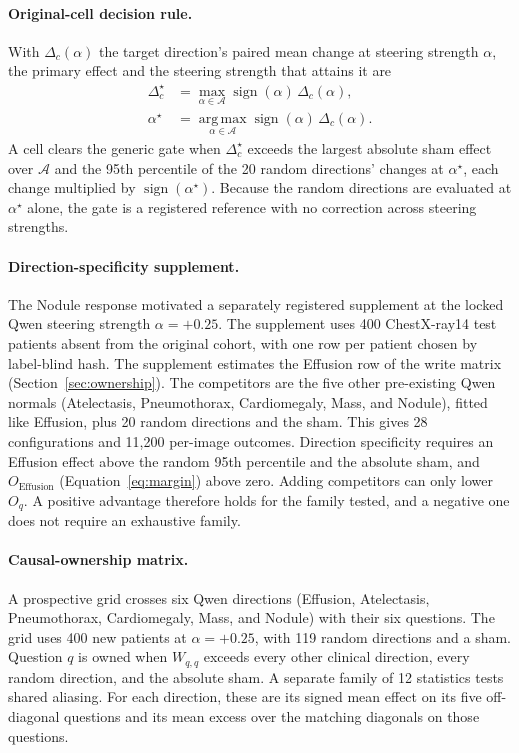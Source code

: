 \documentclass[11pt]{article}
\begin{document}
\paragraph{Original-cell decision rule.}
With $\Delta_c(\alpha)$ the target direction's paired mean change at steering strength $\alpha$, the primary effect and the steering strength that attains it are
\begin{equation}
\begin{aligned}
\Delta^\star_c&=\max_{\alpha\in\mathcal A}\operatorname{sign}(\alpha)\,\Delta_c(\alpha),\\
\alpha^\star&=\operatorname*{arg\,max}_{\alpha\in\mathcal A}\operatorname{sign}(\alpha)\,\Delta_c(\alpha).
\end{aligned}
\label{eq:seed-rule}
\end{equation}
A cell clears the generic gate when $\Delta^\star_c$ exceeds the largest absolute sham effect over $\mathcal A$ and the 95th percentile of the 20 random directions' changes at $\alpha^\star$, each change multiplied by $\operatorname{sign}(\alpha^\star)$. Because the random directions are evaluated at $\alpha^\star$ alone, the gate is a registered reference with no correction across steering strengths.

\paragraph{Direction-specificity supplement.}
The Nodule response motivated a separately registered supplement at the locked Qwen steering strength $\alpha=+0.25$. The supplement uses 400 ChestX-ray14 test patients absent from the original cohort, with one row per patient chosen by label-blind hash. The supplement estimates the Effusion row of the write matrix (Section~\ref{sec:ownership}). The competitors are the five other pre-existing Qwen normals (Atelectasis, Pneumothorax, Cardiomegaly, Mass, and Nodule), fitted like Effusion, plus 20 random directions and the sham. This gives 28 configurations and 11,200 per-image outcomes. Direction specificity requires an Effusion effect above the random 95th percentile and the absolute sham, and $O_{\mathrm{Effusion}}$ (Equation~\ref{eq:margin}) above zero. Adding competitors can only lower $O_q$. A positive advantage therefore holds for the family tested, and a negative one does not require an exhaustive family.

\paragraph{Causal-ownership matrix.}
A prospective grid crosses six Qwen directions (Effusion, Atelectasis, Pneumothorax, Cardiomegaly, Mass, and Nodule) with their six questions. The grid uses 400 new patients at $\alpha=+0.25$, with 119 random directions and a sham. Question $q$ is owned when $W_{q,q}$ exceeds every other clinical direction, every random direction, and the absolute sham. A separate family of 12 statistics tests shared aliasing. For each direction, these are its signed mean effect on its five off-diagonal questions and its mean excess over the matching diagonals on those questions.
\end{document}
